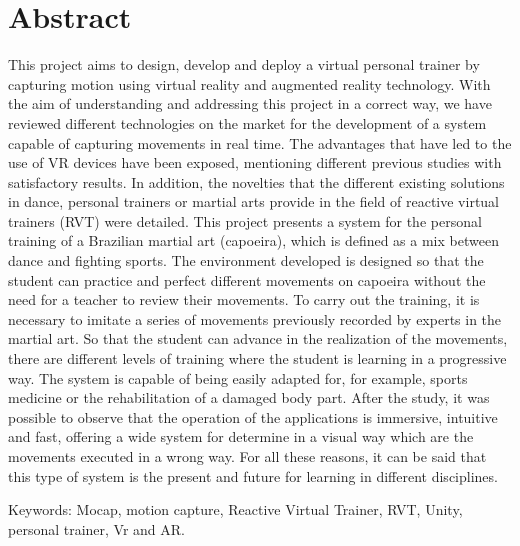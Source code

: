 %
%


\chapter*{Abstract}


This project aims to design, develop and deploy a virtual personal trainer by capturing motion using virtual reality and augmented reality technology.
With the aim of understanding and addressing this project in a correct way, we have reviewed different technologies on the market for the development of a system capable of capturing movements in real time. The advantages that have led to the use of VR devices have been exposed, mentioning different previous studies with satisfactory results. In addition, the novelties that the different existing solutions in dance, personal trainers or martial arts provide in the field of reactive virtual trainers (RVT) were detailed.
This project presents a system for the personal training of a Brazilian martial art (capoeira), which is defined as a mix between dance and fighting sports. The environment developed is designed so that the student can practice and perfect different movements on capoeira without the need for a teacher to review their movements.
To carry out the training, it is necessary to imitate a series of movements previously recorded by experts in the martial art. So that the student can advance in the realization of the movements, there are different levels of training where the student is learning in a progressive way.
The system is capable of being easily adapted for, for example, sports medicine or the rehabilitation of a damaged body part.
After the study, it was possible to observe that the operation of the applications is immersive, intuitive and fast, offering a wide system for 
determine in a visual way which are the movements executed in a wrong way. For all these reasons, it can be said that this type of system is the present and future for learning in different disciplines.

Keywords: Mocap, motion capture, Reactive Virtual Trainer, RVT, Unity, personal trainer, Vr and AR.
